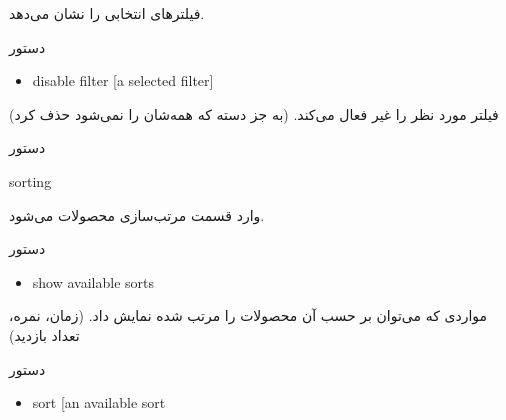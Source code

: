 \documentclass[]{article}
\begin{document}
فیلترهای انتخابی را نشان می‌دهد.


\begin{mybox}[colback=brilliantlavender]{دستور}

\begin{latin}

\begin{itemize}[label = {$\Rightarrow$}]

\item
disable filter [a selected filter]

\end{itemize}

\end{latin}

\end{mybox}

فیلتر مورد نظر را غیر فعال می‌کند. (به جز دسته که همه‌شان را نمی‌شود حذف کرد)

\hrulefill

\begin{mybox}[colback=yellow]{دستور}

\begin{latin}

sorting

\end{latin}

\end{mybox}

وارد قسمت مرتب‌سازی محصولات می‌شود.



\begin{mybox}[colback=brilliantlavender]{دستور}

\begin{latin}

\begin{itemize}[label = {$\Rightarrow$}]

\item
show available sorts

\end{itemize}

\end{latin}

\end{mybox}

مواردی که می‌توان بر حسب آن محصولات را مرتب شده نمایش داد. (زمان، نمره، تعداد بازدید)



\begin{mybox}[colback=brilliantlavender]{دستور}

\begin{latin}

\begin{itemize}[label = {$\Rightarrow$}]

\item
sort [an available sort

\end{itemize}

\end{latin}

\end{mybox}
\end{document}
